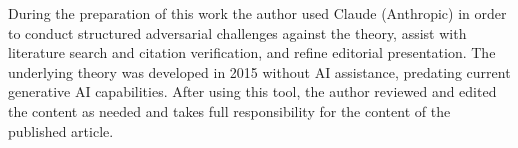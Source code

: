 \documentclass[12pt]{article}
\begin{document}
During the preparation of this work the author used Claude (Anthropic) in order to conduct structured adversarial challenges against the theory, assist with literature search and citation verification, and refine editorial presentation. The underlying theory was developed in 2015 without AI assistance, predating current generative AI capabilities. After using this tool, the author reviewed and edited the content as needed and takes full responsibility for the content of the published article.




\end{document}
